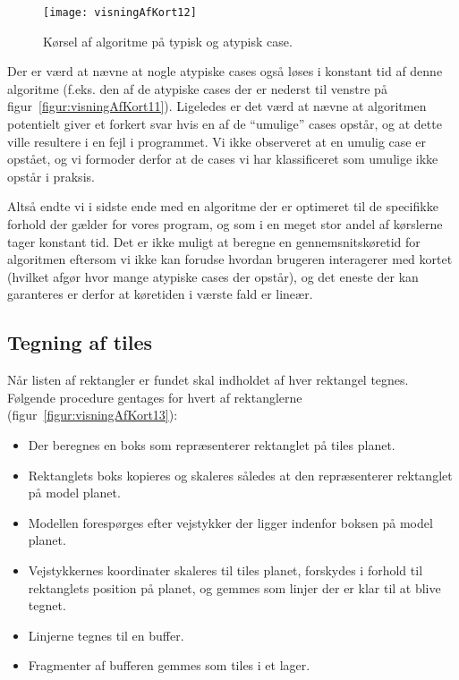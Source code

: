 \begin{figure}[h]
	\centering
	\texttt{[image: visningAfKort12]}
	\captionsetup{width=0.8\textwidth}
	\caption{Kørsel af algoritme på typisk og atypisk case.}
	\label{figur:visningAfKort12}
\end{figure}

Der er værd at nævne at nogle atypiske cases også løses i konstant tid af denne algoritme (f.eks. den af de atypiske cases der er nederst til venstre på figur~\ref{figur:visningAfKort11}). Ligeledes er det værd at nævne at algoritmen potentielt giver et forkert svar hvis en af de ``umulige'' cases opstår, og at dette ville resultere i en fejl i programmet. Vi ikke observeret at en umulig case er opstået, og vi formoder derfor at de cases vi har klassificeret som umulige ikke opstår i praksis.

Altså endte vi i sidste ende med en algoritme der er optimeret til de specifikke forhold der gælder for vores program, og som i en meget stor andel af kørslerne tager konstant tid. Det er ikke muligt at beregne en gennemsnitskøretid for algoritmen eftersom vi ikke kan forudse hvordan brugeren interagerer med kortet (hvilket afgør hvor mange atypiske cases der opstår), og det eneste der kan garanteres er derfor at køretiden i værste fald er lineær.

\subsection{Tegning af tiles}
\label{subsec:tegningAfTiles}

Når listen af rektangler er fundet skal indholdet af hver rektangel tegnes. Følgende procedure gentages for hvert af rektanglerne (figur~\ref{figur:visningAfKort13}):

\begin{itemize}
	\item Der beregnes en boks som repræsenterer rektanglet på tiles planet.
	\item Rektanglets boks kopieres og skaleres således at den repræsenterer rektanglet på model planet.
	\item Modellen forespørges efter vejstykker der ligger indenfor boksen på model planet.
	\item Vejstykkernes koordinater skaleres til tiles planet, forskydes i forhold til rektanglets position på planet, og gemmes som linjer der er klar til at blive tegnet.
	\item Linjerne tegnes til en buffer.
	\item Fragmenter af bufferen gemmes som tiles i et lager.
\end{itemize}

